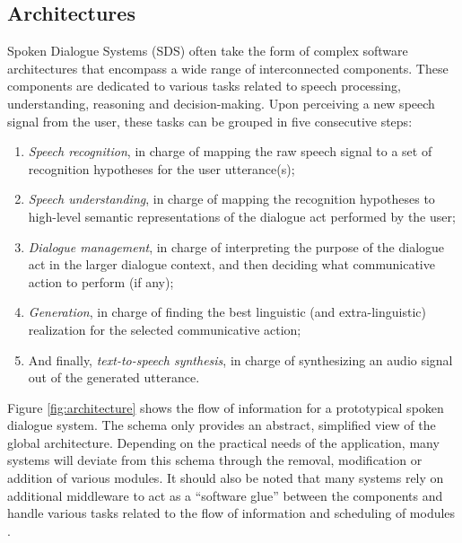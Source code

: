  \subsection{Architectures}
\label{sec:architectures}

Spoken Dialogue Systems (SDS) often take the form of complex software architectures that encompass a wide range of interconnected components. These components are dedicated to various tasks related to speech processing, understanding, reasoning and decision-making. Upon perceiving a new speech signal from the user, these tasks can be grouped in five consecutive steps: 
\begin{enumerate}
\item \textit{Speech recognition}, in charge of mapping the raw speech signal to a set of recognition hypotheses for the user utterance(s);
\item \textit{Speech understanding}, in charge of mapping the recognition hypotheses to high-level semantic representations of the dialogue act performed by the user;
\item \textit{Dialogue management}, in charge of interpreting the purpose of the dialogue act in the larger dialogue context, and then deciding what communicative action to perform (if any);
\item \textit{Generation}, in charge of finding the best linguistic (and extra-linguistic) realization for the selected communicative action;
\item And finally, \textit{text-to-speech synthesis}, in charge of synthesizing an audio signal out of the generated utterance.
 \end{enumerate}
 
 Figure \ref{fig:architecture} shows the flow of information for a prototypical spoken dialogue system.  The schema only provides an abstract, simplified view of the global architecture.  Depending on the practical needs of the application, many systems will deviate from this schema through the removal, modification or addition of various modules.  It should also be noted that many systems rely on additional middleware to act as a ``software glue'' between the components and handle various tasks related to the flow of information and scheduling of modules \citep{jaspis2004,Herzog:2004,Bohus:2009,schlangen2010}.
   
